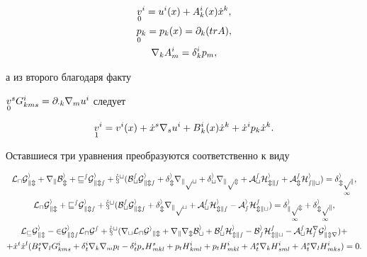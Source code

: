 \begin{gather*} 


\down{0}{v}{}^i=u^i(x)+A{}^i_k(x)\Dot x^k,\\ 


\down{0}{p}{}_k=p_k(x)=\partial_k(trA),\\ 


\nabla_kA{}^i_m=\delta{}^i_kp_m, 


\end{gather*} 


а из второго благодаря факту 


$\underset{0}{v}{}^sG{}^i_{kms}=\partial_{\cdot k}\nabla_m u^i$ следует 


$$ 


\down{1}{v}{}^i=v^i(x)+\Dot x^s\nabla_s u^i+B{}^i_k(x) 


\Dot x^k+\Dot x^ip_k\Dot x^k. 


$$ 


Оставшиеся три уравнения преобразуются соответственно к виду 


\begin{gather*} 


\cal L_uG{}^i_{km}+\nabla_kB{}^i_m+v^sG{}^i_{kms}+ 


\Dot x^t(B{}^s_tG{}^i_{kms}+\delta{}^i_m\nabla_kp_t+ 


\delta{}^i_t\nabla_kp_m+A{}^s_tH{}^i_{mks}+ 


A{}^s_mH{}^i_{skt})=\delta{}^i_m\down{1}{p}{}_k,\\ 


% 


\cal L_uG{}^i_{km}+v^sG{}^i_{kms}+ 


\Dot x^t(B{}^s_tG{}^i_{kms}+\delta{}^i_m\nabla_kp_t+ 


A{}^s_tH{}^i_{mks}- 


A{}^i_sH{}^s_{mkt})=\delta{}^i_k\down{1}{p}{}_m 


+\delta{}^i_m\down{1}{p}{}_k,\\ 


% 


\cal L_vG{}^i_{km}-2G{}^i_{kms}\cal L_uG^s+\Dot x^t 


(\nabla_t\cal L_uG{}^i{}_{km}+\nabla_k\nabla_mB{}^i_t+ 


B{}^s_tH{}^i_{mks}-B{}^i_sH{}^s_{mkt}- 


A{}^s_tH{}^r_sG{}^i_{kmr})+\\ 


% 


+\Dot x^t\Dot x^l(B{}^s_t\nabla_lG{}^i_{kms} 


+\delta{}^i_t\nabla_k\nabla_mp_l-\delta{}^i_tp_sH{}^s_{mkl}+ 


p_tH{}^i_{kml}+p_tH{}^i_{mkl}+A{}^s_t\nabla_kH{}^i_{sml} 


+A{}^s_t\nabla_lH{}^i_{mks})=0. 


\end{gather*} 



